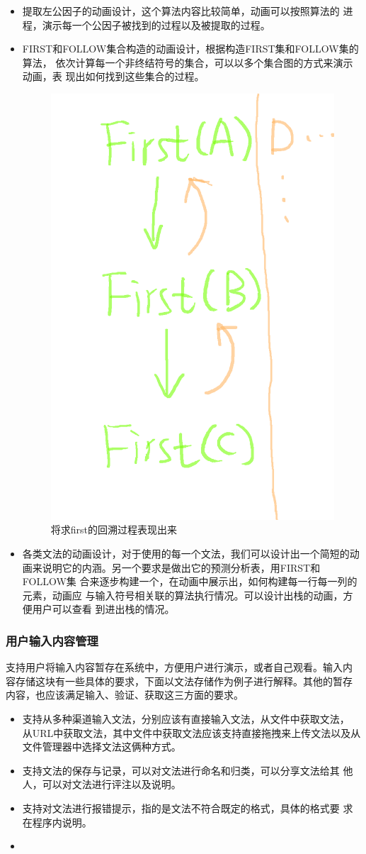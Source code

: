 \begin{itemize}
\begin{figure}[!htb]
            \end{figure}
\item 提取左公因子的动画设计，这个算法内容比较简单，动画可以按照算法的
  进程，演示每一个公因子被找到的过程以及被提取的过程。
\item FIRST和FOLLOW集合构造的动画设计，根据构造FIRST集和FOLLOW集的算法，
  依次计算每一个非终结符号的集合，可以以多个集合图的方式来演示动画，表
  现出如何找到这些集合的过程。
              \begin{figure}[!htb]
              	\centering
              	\includegraphics[width=0.4\linewidth]{img/first.png}
              	\caption{将求first的回溯过程表现出来}
              	\label{fig:first.png}
              \end{figure}
\item 各类文法的动画设计，对于使用的每一个文法，我们可以设计出一个简短的动
  画来说明它的内涵。另一个要求是做出它的预测分析表，用FIRST和FOLLOW集
  合来逐步构建一个，在动画中展示出，如何构建每一行每一列的元素，动画应
  与输入符号相关联的算法执行情况。可以设计出栈的动画，方便用户可以查看
  到进出栈的情况。
\end{itemize}
\subsubsection{用户输入内容管理}
支持用户将输入内容暂存在系统中，方便用户进行演示，或者自己观看。输入内
容存储这块有一些具体的要求，下面以文法存储作为例子进行解释。其他的暂存
内容，也应该满足输入、验证、获取这三方面的要求。
\begin{itemize}
\item 支持从多种渠道输入文法，分别应该有直接输入文法，从文件中获取文法，
  从URL中获取文法，其中文件中获取文法应该支持直接拖拽来上传文法以及从
  文件管理器中选择文法这俩种方式。
\item 支持文法的保存与记录，可以对文法进行命名和归类，可以分享文法给其
  他人，可以对文法进行评注以及说明。
\item 支持对文法进行报错提示，指的是文法不符合既定的格式，具体的格式要
  求在程序内说明。
\item 
\end{itemize}

